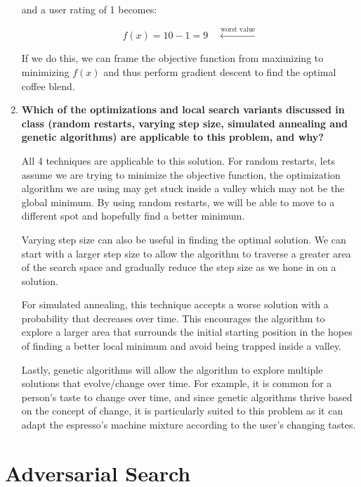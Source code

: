 \documentclass[a4paper]{article}
\begin{document}
\begin{sloppypar}
\begin{enumerate}[start=9,label=Q\arabic*,left=0pt]
    and a user rating of 1 becomes:

    \[ f(x) = 10 - 1 = 9 \quad \xleftarrow{\text{worst value}} \]

    If we do this, we can frame the objective function from maximizing to minimizing $f(x)$ and thus perform gradient descent
    to find the optimal coffee blend.

    \item \textbf{Which of the optimizations and local search variants discussed in class (random restarts, varying step size, simulated annealing and genetic algorithms) are applicable to this problem, and why?}
    \par All 4 techniques are applicable to this solution. For random restarts, lets assume we are trying to minimize the objective
    function, the optimization algorithm we are using may get stuck inside a valley which may not be the global minimum. By using random
    restarts, we will be able to move to a different spot and hopefully find a better minimum.

    Varying step size can also be useful in finding the optimal solution. We can start with a larger step size to allow the algorithm
    to traverse a greater area of the search space and gradually reduce the step size as we hone in on a solution. 

    For simulated annealing, this technique accepts a worse solution with a probability that decreases over time. This encourages the algorithm
    to explore a larger area that surrounds the initial starting position in the hopes of finding a better local minimum and avoid being trapped
    inside a valley. 

    Lastly, genetic algorithms will allow the algorithm to explore multiple solutions that evolve/change over time. For example,
    it is common for a person's taste to change over time, and since genetic algorithms thrive based on the concept of change, it is particularly suited
    to this problem as it can adapt the espresso's machine mixture according to the user's changing tastes.
\end{enumerate}

\section{Adversarial Search}


\end{sloppypar}
\end{document}
